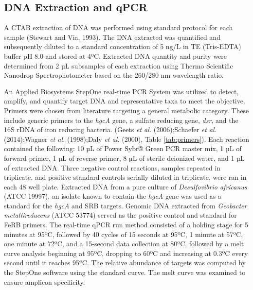 \documentclass[ms, hidelinks]{uncgdissertationexp}
\theoremstyle{plain}
\theoremstyle{definition}
\theoremstyle{remark}
\begin{document}
\hypertarget{dna-extraction-and-qpcr}{%
\subsection{DNA Extraction and qPCR}\label{dna-extraction-and-qpcr}}

A CTAB extraction of DNA was performed using standard protocol for each sample (Stewart and Via, 1993). The DNA extracted was quantified and subsequently diluted to a standard concentration of 5 ng/L in TE (Tris-EDTA) buffer pH 8.0 and stored at 4ºC. Extracted DNA quantity and purity were determined from 2 µL subsamples of each extraction using Thermo Scientific Nanodrop Spectrophotometer based on the 260/280 nm wavelength ratio.

An Applied Biosystems StepOne real-time PCR System was utilized to detect, amplify, and quantify target DNA and representative taxa to meet the objective. Primers were chosen from literature targeting a general metabolic category. These include generic primers to the \emph{hgcA} gene, a sulfate reducing gene, \emph{dsr}, and the 16S rDNA of iron reducing bacteria. (Geets \emph{et al.} (2006);Schaefer \emph{et al.} (2014);Wagner \emph{et al.} (1998);Daly \emph{et al.} (2000), Table \ref{tab:primers}). Each reaction contained the following: 10 µL of Power Sybr® Green PCR master mix, 1 µL of forward primer, 1 µL of reverse primer, 8 µL of sterile deionized water, and 1 µL of extracted DNA. Three negative control reactions, samples repeated in triplicate, and positive standard controls serially diluted in triplicate, were ran in each 48 well plate. Extracted DNA from a pure culture of \emph{Desulfovibrio africanus} (ATCC 19997), an isolate known to contain the \emph{hgcA} gene was used as a standard for the \emph{hgcA} and SRB targets. Genomic DNA extracted from \emph{Geobacter metallireducens} (ATCC 53774) served as the positive control and standard for FeRB primers. The real-time qPCR run method consisted of a holding stage for 5 minutes at 95ºC, followed by 40 cycles of 15 seconds at 95ºC, 1 minute at 57ºC, one minute at 72ºC, and a 15-second data collection at 80ºC, followed by a melt curve analysis beginning at 95ºC, dropping to 60ºC and increasing at 0.3ºC every second until it reaches 95ºC. The relative abundance of targets was computed by the StepOne software using the standard curve. The melt curve was examined to ensure amplicon specificity.
\end{document}
